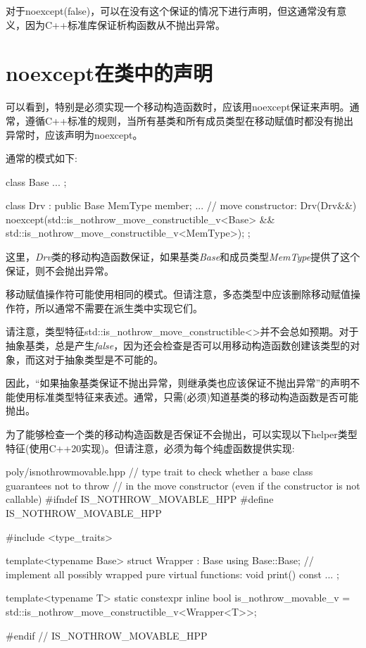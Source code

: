 对于noexcept(false)，可以在没有这个保证的情况下进行声明，但这通常没有意义，因为C++标准库保证析构函数从不抛出异常。\par


\section{noexcept在类中的声明}

可以看到，特别是必须实现一个移动构造函数时，应该用noexcept保证来声明。通常，遵循C++标准的规则，当所有基类和所有成员类型在移动赋值时都没有抛出异常时，应该声明为noexcept。\par

通常的模式如下:\par

\begin{codebox}[cpp]
class Base {
  ...
};

class Drv : public Base {
  MemType member;
  ...
  // move constructor:
  Drv(Drv&&) noexcept(std::is_nothrow_move_constructible_v<Base> &&
  std::is_nothrow_move_constructible_v<MemType>);
};
\end{codebox}

这里，\textit{Drv}类的移动构造函数保证，如果基类\textit{Base}和成员类型\textit{MemType}提供了这个保证，则不会抛出异常。\par

移动赋值操作符可能使用相同的模式。但请注意，多态类型中应该删除移动赋值操作符，所以通常不需要在派生类中实现它们。\par


请注意，类型特征std::is\_nothrow\_move\_constructible<>并不会总如预期。对于抽象基类，总是产生\textit{false}，因为还会检查是否可以用移动构造函数创建该类型的对象，而这对于抽象类型是不可能的。\par

因此，“如果抽象基类保证不抛出异常，则继承类也应该保证不抛出异常”的声明不能使用标准类型特征来表述。通常，只需(必须)知道基类的移动构造函数是否可能抛出。\par

为了能够检查一个类的移动构造函数是否保证不会抛出，可以实现以下helper类型特征(使用C++20实现)。但请注意，必须为每个纯虚函数提供实现:\par

\begin{codeboxt}[cpp]{poly/isnothrowmovable.hpp}
// type trait to check whether a base class guarantees not to throw
// in the move constructor (even if the constructor is not callable)
#ifndef IS_NOTHROW_MOVABLE_HPP
#define IS_NOTHROW_MOVABLE_HPP

#include <type_traits>

template<typename Base>
struct Wrapper : Base {
  using Base::Base;
  // implement all possibly wrapped pure virtual functions:
  void print() const {}
  ...
};

template<typename T>
static constexpr inline bool is_nothrow_movable_v
  = std::is_nothrow_move_constructible_v<Wrapper<T>>;

#endif // IS_NOTHROW_MOVABLE_HPP
\end{codeboxt}

